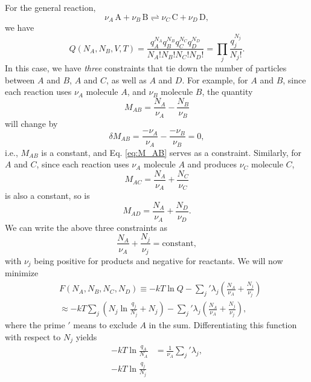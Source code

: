 \documentclass[twocolumn, 10pt]{article}
\numberwithin{equation}{section}
\newenvironment{solution}[1][\empty]
{\par\medskip\sffamily
  \textbf{\ifx\empty#1{Solution.}\relax\else{#1}\fi} \ignorespaces}
{\medskip}
\begin{document}
\begin{solution}
  For the general reaction,
  \begin{equation}
  \nu_A \, \mathrm{A} + \nu_B \, \mathrm{B}
  \rightleftharpoons
  \nu_C \, \mathrm{C} + \nu_D \, \mathrm{D},
    \label{eq:chemreact_ABCD}
  \end{equation}
  we have
  $$
  Q(N_A, N_B, V, T)
  =
  \frac{ q_A^{N_A} q_B^{N_B} q_C^{N_C} q_D^{N_D} }
  { N_A! N_B! N_C! N_D!}
  =
  \prod_j \frac{ q_j^{N_j} } { N_j! }.
  $$
  In this case, we have \emph{three}
  constraints that tie down the number of particles
  between
  $A$ and $B$,
  $A$ and $C$,
  as well as
  $A$ and $D$.
  For example, for $A$ and $B$,
  since each reaction uses $\nu_A$ molecule $A$,
  and $\nu_B$ molecule $B$,
  the quantity
  \begin{equation}
    M_{AB} = \frac{ N_A } {\nu_A } - \frac{N_B}{\nu_B}
    \label{eq:M_AB}
  \end{equation}
  will change by
  $$
  \delta M_{AB} = \frac{ -\nu_A } {\nu_A } - \frac{ -\nu_B } {\nu_B} = 0,
  $$
  i.e., $M_{AB}$ is a constant,
  and Eq. \eqref{eq:M_AB} serves as a constraint.
  Similarly, for $A$ and $C$,
  since each reaction uses $\nu_A$ molecule $A$
  and produces $\nu_C$ molecule $C$,
  \begin{equation}
    M_{AC} = \frac{ N_A }{ \nu_A } + \frac{N_C}{\nu_C}
    \label{eq:M_AC}
  \end{equation}
  is also a constant, so is
  \begin{equation}
    M_{AD} = \frac{ N_A }{ \nu_A } + \frac{N_D}{\nu_D}
    .
    \label{eq:M_AD}
  \end{equation}
  We can write the above three constraints as
  $$
  \frac{N_A}{\nu_A} + \frac{N_j}{\nu_j} = \mathrm{constant},
  $$
  with $\nu_j$ being positive for products
  and negative for reactants.
  We will now minimize
  \begin{align*}
    &F(N_A, N_B, N_C, N_D)
    \equiv -k T \ln Q
    - {\sum_j}'
    \lambda_j \left( \frac{N_A}{\nu_A} + \frac{N_j}{\nu_j} \right)
    \\
    &\approx
    -kT \sum_j \left(N_j \ln\frac{ q_j}{ N_j} + N_j\right)
    - {\sum_j}' \lambda_j \left( \frac{N_A}{\nu_A} + \frac{N_j}{\nu_j} \right)
    ,
  \end{align*}
  where the prime $'$ means to exclude $A$ in the sum.
  Differentiating this function with respect to $N_j$ yields
  \begin{align*}
    -kT \ln \frac{q_A}{N_A}
    &= \frac{1}{\nu_A} {\sum_j}' \lambda_j,
    \\
    -kT \ln \frac{q_j}{N_j}

\end{align*}
\end{solution}
\end{document}
